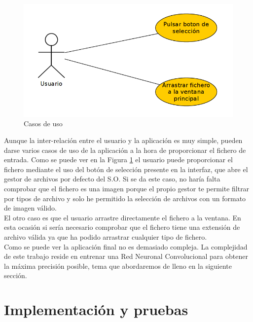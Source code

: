 \documentclass[a4paper,11pt]{book}
\begin{document}

\begin{figure}[t]
	\centering
	\includegraphics[width=0.7\linewidth]{imagenes/usecases}
	\caption[Casos de uso.]{Casos de uso}
	\label{fig:usecases}
\end{figure}

Aunque la inter-relación entre el usuario y la aplicación es muy simple, pueden darse varios casos de uso de la aplicación a la hora de proporcionar el fichero de entrada. Como se puede ver en la Figura \ref{fig:usecases} el usuario puede proporcionar el fichero mediante el uso del botón de selección presente en la interfaz, que abre el gestor de archivos por defecto del S.O. Si se da este caso, no haría falta comprobar que el fichero es una imagen porque el propio gestor te permite filtrar por tipos de archivo y solo he permitido la selección de archivos con un formato de imagen válido.\\
El otro caso es que el usuario arrastre directamente el fichero a la ventana. En esta ocasión si sería necesario comprobar que el fichero tiene una extensión de archivo válida ya que ha podido arrastrar cualquier tipo de fichero.\\
Como se puede ver la aplicación final no es demasiado compleja. La complejidad de este trabajo reside en entrenar una Red Neuronal Convolucional para obtener la máxima precisión posible, tema que abordaremos de lleno en la siguiente sección.



\section{Implementación y pruebas}
\end{document}
